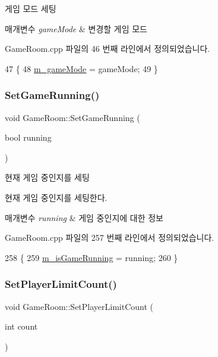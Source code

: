 게임 모드 세팅 


\begin{DoxyParams}{매개변수}
{\em game\+Mode} & 변경할 게임 모드 \\
\hline
\end{DoxyParams}


Game\+Room.\+cpp 파일의 46 번째 라인에서 정의되었습니다.


\begin{DoxyCode}
47 \{
48     \hyperlink{class_game_room_a47c8f21ede7fd6fa526ebfcb069dcf45}{m\_gameMode} = gameMode;
49 \}
\end{DoxyCode}
\mbox{\label{class_game_room_a8e423ee03803dacb43d097cd87cc220b}} 
\subsubsection{\texorpdfstring{Set\+Game\+Running()}{SetGameRunning()}}
{\footnotesize\ttfamily void Game\+Room\+::\+Set\+Game\+Running (\begin{DoxyParamCaption}\item[{bool}]{running }\end{DoxyParamCaption})}



현재 게임 중인지를 세팅 

현재 게임 중인지를 세팅한다.


\begin{DoxyParams}{매개변수}
{\em running} & 게임 중인지에 대한 정보 \\
\hline
\end{DoxyParams}


Game\+Room.\+cpp 파일의 257 번째 라인에서 정의되었습니다.


\begin{DoxyCode}
258 \{
259     \hyperlink{class_game_room_afd3dbeca203aed6a441449ce8a640d15}{m\_isGameRunning} = running;
260 \}
\end{DoxyCode}
\mbox{\label{class_game_room_add1aa703d428eaeb558499adb8ab5fb0}} 
\subsubsection{\texorpdfstring{Set\+Player\+Limit\+Count()}{SetPlayerLimitCount()}}
{\footnotesize\ttfamily void Game\+Room\+::\+Set\+Player\+Limit\+Count (\begin{DoxyParamCaption}\item[{int}]{count }\end{DoxyParamCaption})}



